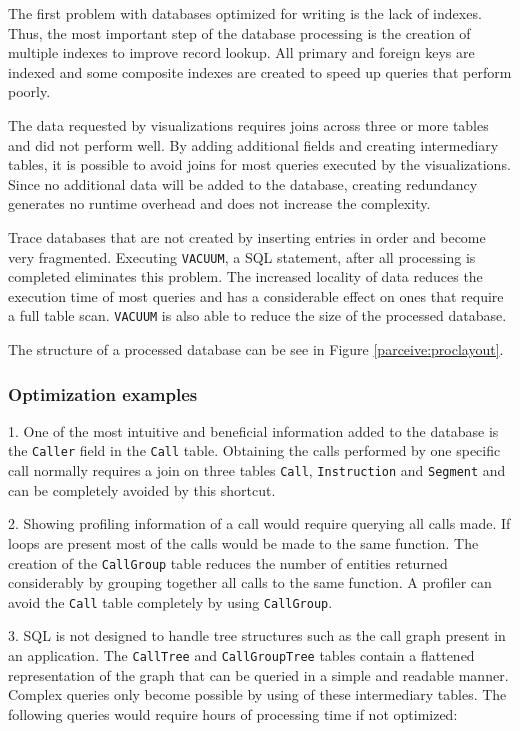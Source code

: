 The first problem with databases optimized for writing is the lack of indexes. Thus, the most important step of the database processing is the creation of multiple indexes to improve record lookup. All primary and foreign keys are indexed and some composite indexes are created to speed up queries that perform poorly.

The data requested by visualizations requires joins across three or more tables and did not perform well. By adding additional fields and creating intermediary tables, it is possible to avoid joins for most queries executed by the visualizations. Since no additional data will be added to the database, creating redundancy generates no runtime overhead and does not increase the complexity.

Trace databases that are not created by inserting entries in order and become very fragmented. Executing \texttt{VACUUM}, a SQL statement, after all processing is completed eliminates this problem. The increased locality of data reduces the execution time of most queries and has a considerable effect on ones that require a full table scan. \texttt{VACUUM} is also able to reduce the size of the processed database.

The structure of a processed database can be see in Figure \ref{parceive:proclayout}.

\subsubsection{Optimization examples}

1. One of the most intuitive and beneficial information added to the database is the \texttt{Caller} field in the \texttt{Call} table. Obtaining the calls performed by one specific call normally requires a join on three tables \texttt{Call}, \texttt{Instruction} and \texttt{Segment} and can be completely avoided by this shortcut.

2. Showing profiling information of a call would require querying all calls made. If loops are present most of the calls would be made to the same function. The creation of the \texttt{CallGroup} table reduces the number of entities returned considerably by grouping together all calls to the same function. A profiler can avoid the \texttt{Call} table completely by using \texttt{CallGroup}.

3. SQL is not designed to handle tree structures such as the call graph present in an application. The \texttt{CallTree} and \texttt{CallGroupTree} tables contain a flattened representation of the graph that can be queried in a simple and readable manner. Complex queries only become possible by using of these intermediary tables. The following queries would require hours of processing time if not optimized:

